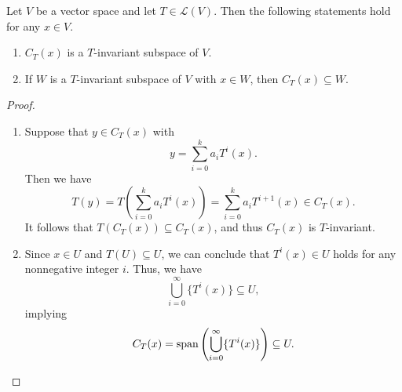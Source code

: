 \begin{theorem}
  Let $V$ be a vector space and let $T \in \mathcal{L}(V)$.
  Then the following statements hold for any $x \in V$.
  \begin{enumerate}
    \item $C_T(x)$ is a $T$-invariant subspace of $V$.
    \item If $W$ is a $T$-invariant subspace of $V$ with $x \in W$, then
    $C_T(x) \subseteq W$.
  \end{enumerate}
\end{theorem}
\begin{proof}
  \leavevmode
  \begin{enumerate}
    \item Suppose that $y \in C_T(x)$ with
    \begin{equation*}
      y = \sum_{i=0}^k a_iT^i(x).
    \end{equation*}
    Then we have
    \begin{equation*}
      T(y)
      = T\left(\sum_{i=0}^k a_iT^i(x)\right)
      = \sum_{i=0}^k a_iT^{i+1}(x)
      \in C_T(x).
    \end{equation*}
    It follows that $T(C_T(x)) \subseteq C_T(x)$, and thus $C_T(x)$ is
    $T$-invariant.
    \item Since $x \in U$ and $T(U) \subseteq U$, we can conclude that
    $T^i(x) \in U$ holds for any nonnegative integer $i$.
    Thus, we have
    \begin{equation*}
      \bigcup_{i=0}^\infty \{T^i(x)\} \subseteq U,
    \end{equation*}
    implying
    \begin{equation*}
      C_T(x)
      = \operatorname{span}\left(\bigcup_{i=0}^\infty \{T^i(x)\}\right)
      \subseteq U.
      \qedhere
    \end{equation*}
  \end{enumerate}
\end{proof}